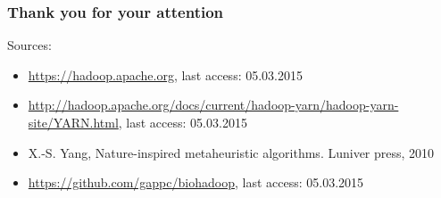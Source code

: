 \begin{frame}
  \frametitle{Thank you for your attention}
  Sources:
  \begin{itemize}
    \item \url{https://hadoop.apache.org}, last access: 05.03.2015
    \item \url{http://hadoop.apache.org/docs/current/hadoop-yarn/hadoop-yarn-site/YARN.html}, last access: 05.03.2015
    \item X.-S. Yang, Nature-inspired metaheuristic algorithms. Luniver press, 2010
    \item \url{https://github.com/gappc/biohadoop}, last access: 05.03.2015
  \end{itemize}
\end{frame}